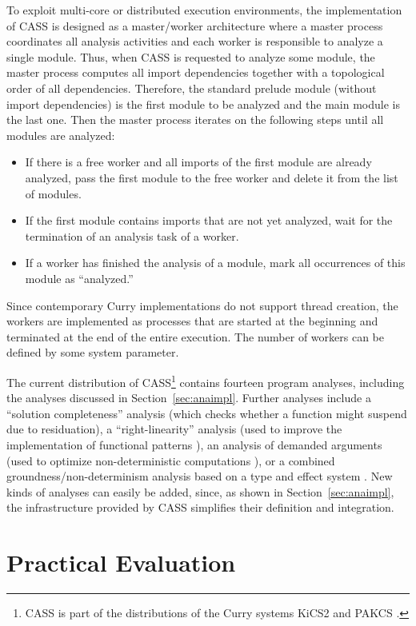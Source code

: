 \documentclass{llncs}
\begin{document}
To exploit multi-core or distributed execution environments,
the implementation of CASS is designed as a master/worker architecture
where a master process coordinates all analysis activities
and each worker is responsible to analyze a single module.
Thus, when CASS is requested to analyze some module,
the master process computes all import dependencies
together with a topological order of all dependencies.
Therefore, the standard prelude module (without import dependencies)
is the first module to be analyzed and the main module is the last one.
Then the master process iterates on the following steps
until all modules are analyzed:
\begin{itemize}
\item If there is a free worker and all imports of the first module
are already analyzed, pass the first module to the free worker
and delete it from the list of modules.
\item If the first module contains imports that are not yet analyzed,
wait for the termination of an analysis task of a worker.
\item If a worker has finished the analysis of a module,
mark all occurrences of this module as ``analyzed.''
\end{itemize}
Since contemporary Curry implementations do not support
thread creation, the workers are implemented as processes
that are started at the beginning and terminated at the end of the
entire execution. The number of workers can be defined by some
system parameter.

The current distribution of CASS\footnote{CASS is part of the distributions
of the Curry systems KiCS2 \cite{BrasselHanusPeemoellerReck11}
and PAKCS \cite{Hanus13PAKCS}.} contains fourteen program analyses,
including the analyses discussed in Section~\ref{sec:anaimpl}.
Further analyses include
a ``solution completeness'' analysis (which checks whether a function
might suspend due to residuation),
a ``right-linearity'' analysis (used to improve the implementation
of functional patterns \cite{AntoyHanus05LOPSTR}),
an analysis of demanded arguments (used to optimize non-deterministic
computations \cite{Hanus12ICLP}),
or a combined groundness/non-determinism analysis based on a
type and effect system \cite{BrasselHanus05}.
New kinds of analyses can easily be added, since,
as shown in Section~\ref{sec:anaimpl},
the infrastructure provided by CASS simplifies their definition and
integration.


\section{Practical Evaluation}
\label{sec:eval}
\end{document}
